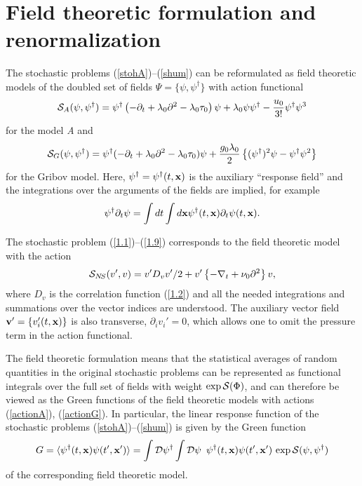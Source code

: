 \documentclass[12pt]{iopart}
\begin{document}
\section{Field theoretic formulation and renormalization} \label{sec:QFT}


The stochastic problems (\ref{stohA})--(\ref{shum}) can be reformulated
as field theoretic models of the doubled set of fields
$\Psi = \{\psi,\psi^{\dag}\}$ with action functional
\begin{eqnarray}
{\cal S}_{A} (\psi,\psi^{\dag}) =  \psi^{\dag}
\left(-\partial_{t}+\lambda_{0} \partial^{2}- \lambda_{0}\tau_{0}\right)
\psi + \lambda_{0} \psi\psi^{\dagger} - \frac{u_{0}}{3!} \psi^{\dag}\psi^3
\label{actionA}
\end{eqnarray}
for the model {\it A} and
\begin{eqnarray}
{\cal S}_{G} (\psi,\psi^{\dag}) =  \psi^{\dag}
(-\partial_{t}+\lambda_{0} \partial^{2}- \lambda_{0}\tau_{0}) \psi
+ \frac{g_{0}\lambda_{0}}{2} \left\{ (\psi^{\dagger})^2\psi -
\psi^{\dagger}\psi^2  \right\}
\label{actionG}
\end{eqnarray}
for the Gribov model.
Here, $\psi^{\dag}=\psi^{\dag}(t,{\bf x})$ is the auxiliary ``response
field'' and the integrations over the arguments of the fields are implied,
for example
\[  \psi^{\dag}\partial_{t}\psi = \int dt \int d{\bf x}
\psi^{\dag}(t,{\bf x})\partial_{t}\psi(t,{\bf x}). \]


The stochastic problem (\ref{1.1})--(\ref{1.9}) corresponds to the
field theoretic model with the action
\begin{equation}
{\cal S}_{N\!S}({v}', {v}) =
v 'D_{v}v'/2+ v'\left\{-\nabla_t +\nu _0\partial^{2} \right\} v,
\label{actionV}
\end{equation}
where $D_{v}$ is the correlation function (\ref{1.2}) and all the needed
integrations and summations over the vector indices are understood.
The auxiliary vector field ${\bf v}'= \{ v'_{i}(t,{\bf x})\}$ is also
transverse, $\partial_{i}v_{i}'=0$,
which allows one to omit the pressure term in the action functional.

The field theoretic formulation means that the statistical averages
of random quantities in the original stochastic problems can be represented
as functional integrals over the full set of fields with weight
$\exp {\cal S}(\Phi)$, and can therefore be viewed as the Green functions
of the field theoretic models with actions (\ref{actionA}), (\ref{actionG}).
In particular, the linear response function of the stochastic problems
(\ref{stohA})--(\ref{shum}) is given by the Green function
\begin{eqnarray}
G=\langle \psi^{\dag}(t, {\bf x}) \psi(t', {\bf x'} ) \rangle =
\int {\cal D}\psi^{\dag} \int {\cal D} \psi\ \,
\psi^{\dag}(t, {\bf x}) \psi(t', {\bf x'})\, \exp {\cal S}(\psi,\psi^{\dag})
\label{respd}
\end{eqnarray}
of the corresponding field theoretic model.
\end{document}

